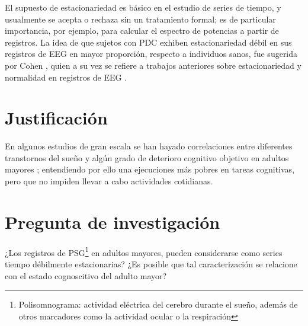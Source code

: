 El supuesto de estacionariedad es b\'asico en el estudio de series de tiempo, y usualmente se 
acepta o rechaza sin un tratamiento formal; es de particular importancia, por ejemplo, para 
calcular el espectro de potencias a partir de registros.
La idea de que sujetos con PDC exhiben estacionariedad d\'ebil en sus registros de EEG en mayor 
proporci\'on, respecto a individuos sanos, fue sugerida por Cohen \cite{Cohen77}, quien a su vez se 
refiere a trabajos anteriores sobre estacionariedad y normalidad en registros de EEG 
\cite{McEwen75,Sugimoto78,Kawabata73}.


\section{Justificaci\'on}

En algunos estudios de gran escala se han hayado correlaciones entre diferentes transtornos del 
sueño y algún grado de deterioro cognitivo objetivo en adultos mayores 
\cite{Amer13,Miyata13,Reid06,Potvin12}; entendiendo por ello una ejecuciones más pobres en tareas
cognitivas, pero que no impiden llevar a cabo actividades cotidianas.


\section{Pregunta de investigaci\'on}

¿Los registros de PSG\footnote{Polisomnograma: actividad eléctrica del cerebro durante el sueño,
además de otros marcadores como la actividad ocular o la respiración} en adultos mayores, pueden
considerarse como series tiempo débilmente estacionarias?
¿Es posible que tal caracterización se relacione con el estado cognoscitivo del adulto mayor?

